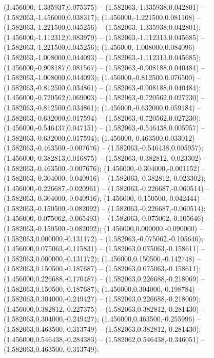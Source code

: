  (1.456000,-1.335937,0.075375) -- (1.582063,-1.335938,0.042801) -- (1.582063,-1.456000,0.038317);
 (1.456000,-1.221500,0.081108) -- (1.582063,-1.221500,0.045256) -- (1.582063,-1.335938,0.042801);
 (1.456000,-1.112312,0.083979) -- (1.582063,-1.112313,0.045685) -- (1.582063,-1.221500,0.045256);
 (1.456000,-1.008000,0.084096) -- (1.582063,-1.008000,0.044093) -- (1.582063,-1.112313,0.045685);
 (1.456000,-0.908187,0.081567) -- (1.582063,-0.908188,0.040484) -- (1.582063,-1.008000,0.044093);
 (1.456000,-0.812500,0.076500) -- (1.582063,-0.812500,0.034861) -- (1.582063,-0.908188,0.040484);
 (1.456000,-0.720562,0.069003) -- (1.582063,-0.720562,0.027230) -- (1.582063,-0.812500,0.034861);
 (1.456000,-0.632000,0.059184) -- (1.582063,-0.632000,0.017594) -- (1.582063,-0.720562,0.027230);
 (1.456000,-0.546437,0.047151) -- (1.582063,-0.546438,0.005957) -- (1.582063,-0.632000,0.017594);
 (1.456000,-0.463500,0.033012) -- (1.582063,-0.463500,-0.007676) -- (1.582063,-0.546438,0.005957);
 (1.456000,-0.382813,0.016875) -- (1.582063,-0.382812,-0.023302) -- (1.582063,-0.463500,-0.007676);
 (1.456000,-0.304000,-0.001152) -- (1.582063,-0.304000,-0.040916) -- (1.582063,-0.382812,-0.023302);
 (1.456000,-0.226687,-0.020961) -- (1.582063,-0.226687,-0.060514) -- (1.582063,-0.304000,-0.040916);
 (1.456000,-0.150500,-0.042444) -- (1.582063,-0.150500,-0.082092) -- (1.582063,-0.226687,-0.060514);
 (1.456000,-0.075062,-0.065493) -- (1.582063,-0.075062,-0.105646) -- (1.582063,-0.150500,-0.082092);
 (1.456000,0.000000,-0.090000) -- (1.582063,0.000000,-0.131172) -- (1.582063,-0.075062,-0.105646);
 (1.456000,0.075063,-0.115831) -- (1.582063,0.075063,-0.158611) -- (1.582063,0.000000,-0.131172);
 (1.456000,0.150500,-0.142748) -- (1.582063,0.150500,-0.187687) -- (1.582063,0.075063,-0.158611);
 (1.456000,0.226688,-0.170487) -- (1.582063,0.226688,-0.218069) -- (1.582063,0.150500,-0.187687);
 (1.456000,0.304000,-0.198784) -- (1.582063,0.304000,-0.249427) -- (1.582063,0.226688,-0.218069);
 (1.456000,0.382812,-0.227375) -- (1.582063,0.382812,-0.281430) -- (1.582063,0.304000,-0.249427);
 (1.456000,0.463500,-0.255996) -- (1.582063,0.463500,-0.313749) -- (1.582063,0.382812,-0.281430);
 (1.456000,0.546438,-0.284383) -- (1.582062,0.546438,-0.346051) -- (1.582063,0.463500,-0.313749);
